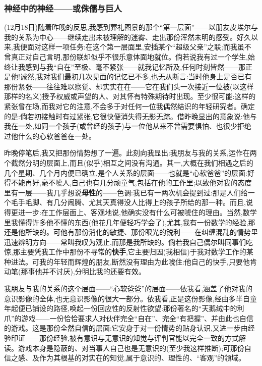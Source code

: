 \subsubsection*{神经中的神经——或侏儒与巨人}
\label{ch18:local:h61}

\label{ch18:local:n56}

(12月18日)随着昨晚的反思,我感到葬礼图景的那个“第一层面”——以朋友皮埃尔与我的关系为中心——继续走出未被理解的迷雾、走出那份浑然未明的感受。好久以来,我便面对这样一项任务:在这个第一层面里,安插某个“超级父亲”之联;而我虽不曾真正对自己言明,那份联却似乎不很乐意体面地就位。倘若说我有过一个学生,始终让我感到与我“自在”至极、毫不紧张——就我记忆所及,任何时刻皆然——那正是他!诚然,我对我们最初几次见面的记忆已不多,也无从断言:当时他身上是否已有那份紧张——往往难以察觉、却实实在在——它在我们头一次接近一位被(以这样那样的名义)授予权威或声望的人、对其怀有特殊期待时出现。至少很可能:这样的紧张曾在场,而我对它的注意,不会多于对任何一位我偶然结识的年轻研究者。确定的是:倘若初接触时有过紧张,它很快便消失得无影无踪。借昨晚显出的意象说:他与我在一处,如同一个孩子(或曾经的孩子)与一位他从来不曾需要惧怕、也很少拒绝过他什么的心软爸爸在一处。

昨晚停笔后,我又把那份情势想了一遍。此刻向我显出:我朋友与我的关系,运作在两个截然分明的层面\dmark{}上,而且(似乎)相互之间没有沟通。其一,大概在我们相遇之后的几个星期、几个月内便已确立,是个人关系的层面——也就是“心软爸爸”的层面:好得不能再好,毫不唬人,自己也有几分顽童气,包括在他的工作里;以致他对我的态度里有一层——我几乎想说\textbf{母性}的——色调:我已有一两次机会提到过:那是人们给一个毛手毛脚、有几分闹腾、尤其天真得没人比得上的孩子所给的那一种。而且,说得更进一步:在工作层面上、客观地说,他确实没有什么可被唬住的理由。当然,数学里我懂得许多他不懂的东西(他花几年便轻巧学会了),尤其,我有一份数学的经验,那还是他所缺的。可他有那份消化的敏捷、那份眼光的锐利——在纠缠混乱的情势里迅速辨明方向——常叫我叹为观止,而那是我所缺的。倘若我自己偶尔叫同事们吃惊,那主要凭我工作中那份不寻常的\textbf{快手},它主要归因(我相信)于我对数学工作的某种进法。可我的年轻而辉煌的朋友,断然没有理由为此唬住:他自己的快手,只要他肯动笔(那事他并不讨厌),分明比我的还要有效。

我朋友与我的关系的这个层面——“心软爸爸”的层面——依我看,涵盖了他对我的意识影像的全体,也无意识影像的很大一部分。依我看,正是这份影像,经由多半自童年起便已铺设的路径,唤起一份回应性的反射性欲望:那份著名的“天鹅绒中的利爪”的游戏——一份恰恰要求人对伙伴完全“自在”、完全“有把握”、并由此也自信的游戏。这是那份全然自信的层面:它安身于对一份情势的贴身认识,又进一步由经验印证——那份经验,被有意识与无意识的知觉与评判官能\dmark{}以完全一致的方式解读。游戏本身是隐蔽的、对当事人自己也是无意识的(至少我这样推断);可那份自信之感、及作为其根基的对实在的知觉,属于意识的、理性的、“客观”的领域。

